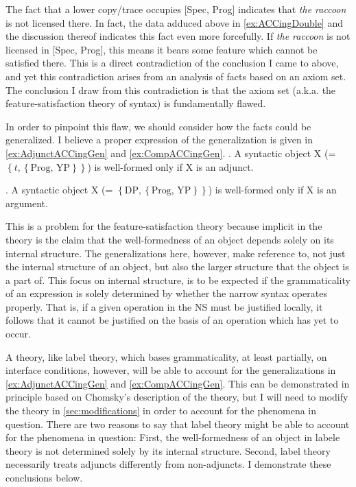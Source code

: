\documentclass[MilwayThesis]{subfiles}
\begin{document}
The fact that a lower copy/trace occupies [Spec, Prog] indicates that \textit{the raccoon} is not licensed there.
In fact, the data adduced above in \cref{ex:ACCingDouble} and the discussion thereof indicates this fact even more forcefully.
If \textit{the raccoon} is not licensed in [Spec, Prog], this means it bears some feature which cannot be satisfied there.
This is a direct contradiction of the conclusion I came to above, and yet this contradiction arises from an analysis of facts based on an axiom set.
The conclusion I draw from this contradiction is that the axiom set (a.k.a. the feature-satisfaction theory of syntax) is fundamentally flawed.

In order to pinpoint this flaw, we should consider how the facts could be generalized.
I believe a proper expression of the generalization is given in \cref{ex:AdjunctACCingGen} and \cref{ex:CompACCingGen}.
\ex. A syntactic object X (= $\left\{ t, \left\{ \text{Prog, YP}  \right\} \right\}$) is well-formed only if X is an adjunct.\label{ex:AdjunctACCingGen}

\ex. A syntactic object X (= $\left\{ \text{DP}, \left\{ \text{Prog, YP}  \right\} \right\}$) is well-formed only if X is an argument.\label{ex:CompACCingGen}

This is a problem for the feature-satisfaction theory because implicit in the theory is the claim that the well-formedness of an object depends solely on its internal structure.
The generalizations here, however, make reference to, not just the internal structure of an object, but also the larger structure that the object is a part of.
This focus on internal structure, is to be expected if the grammaticality of an expression is solely determined by whether the narrow syntax operates properly.
That is, if a given operation in the NS must be justified locally, it follows that it cannot be justified on the basis of an operation which has yet to occur.

A theory, like label theory, which bases grammaticality, at least partially, on interface conditions, however, will be able to account for the generalizations in \cref{ex:AdjunctACCingGen} and \cref{ex:CompACCingGen}.
This can be demonstrated in principle based on Chomsky's description of the theory, but I will need to modify the theory in \cref{sec:modifications} in order to account for the phenomena in question.
There are two reasons to say that label theory might be able to account for the phenomena in question:
First, the well-formedness of an object in labele theory is not determined solely by its internal structure.
Second, label theory necessarily treats adjuncts differently from non-adjuncts.
I demonstrate these conclusions below.
\end{document}
